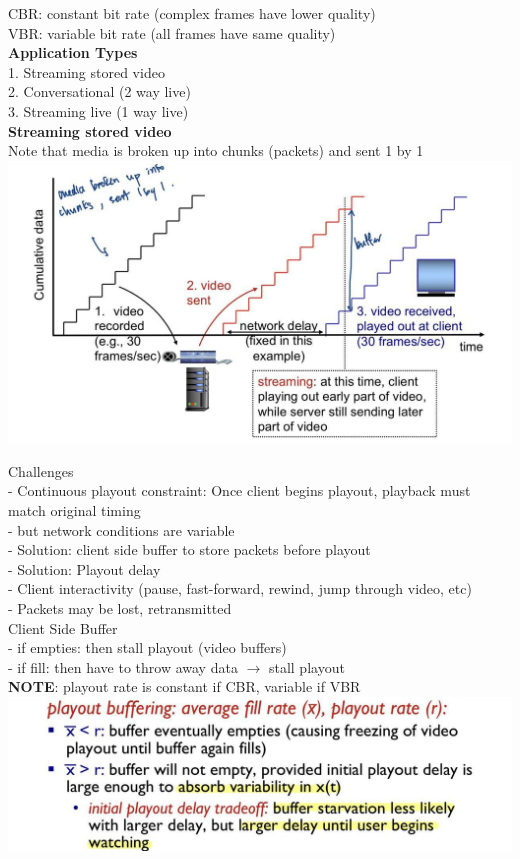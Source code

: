 \documentclass[10pt, a4paper]{article}
\newcommand{\highlight}[1]{{\color{red}\textbf{#1}}}
\newcommand{\blue}[1]{{\color{MidnightBlue}#1}}
\newcommand{\red}[1]{{\color{red}#1}}
\newcommand{\green}[1]{{\color{ForestGreen}#1}}
\newcommand{\tab}[0]{\hspace*{2mm}}
\begin{document}
\begin{multicols*}{3}
		CBR: constant bit rate (complex frames have lower quality)\\
		VBR: variable bit rate (all frames have same quality)\\

		\textbf{Application Types}\\
		1. Streaming stored video\\
		2. Conversational (2 way live)\\
		3. Streaming live (1 way live)\\

		\textbf{Streaming stored video}\\
		Note that media is broken up into chunks (packets) and sent 1 by 1\\
		\includegraphics[scale=.2]{./assets/streamingStored}

		Challenges\\
		- \red{Continuous playout constraint}: Once client begins playout, playback must match original timing\\
		\tab - but network conditions are variable\\
		\tab - \green{Solution}: client side buffer to store packets before playout\\
		\tab - \green{Solution}: Playout delay\\
		- Client interactivity (pause, fast-forward, rewind, jump through video, etc)\\
		- Packets may be lost, retransmitted\\

		Client Side Buffer\\
		- if \red{empties}: then stall playout (video buffers)\\
		- if \red{fill}: then have to throw away data $\rightarrow$ stall playout\\
		\highlight{NOTE}: playout rate is \blue{constant} if \blue{CBR}, \green{variable} if \green{VBR}\\
		\includegraphics[scale=.2]{./assets/playoutBuffering}\\


\end{multicols*}
\end{document}
